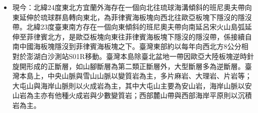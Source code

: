 \documentclass[a4paper,12pt]{report}
\begin{document}
\begin{itemize}
\item 現今：北緯24度東北方宜蘭外海存在一個向北往琉球海溝傾斜的班尼奧夫帶向東延伸於琉球群島轉向東北，為菲律賓海板塊向西北往歐亞板塊下隱沒的隱沒帶。北緯23度臺東南方存在一個向東傾斜的班尼奧夫帶向南延呂宋火山島弧延伸至菲律賓北方，是歐亞板塊向東往菲律賓海板塊下隱沒的隱沒帶，係接續自南中國海板塊隱沒到菲律賓海板塊之下。臺灣東部約以每年向西北方8公分相對於澎湖白沙測站S01R移動。臺灣本島除臺北盆地一帶因歐亞大陸板塊逆時針旋開形成的正斷層，如山腳斷層為第二類正斷層外，大型斷層多為逆斷層。臺灣本島上，中央山脈與雪山山脈以變質岩為主，多片麻岩、大理岩、片岩等；大屯山與海岸山脈則以火成岩為主，其中大屯山主要為安山岩，海岸山脈以安山岩為主亦有他種火成岩與少數變質岩；西部麓山帶與西部海岸平原則以沉積岩為主。
\end{itemize}
\end{document}
